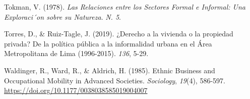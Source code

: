 \documentclass[
  letterpaper,
  12pt,
  oneside,
  spanish,
  doublespacing,
  headsepline,
  parskip]{MastersDoctoralThesis}
\newlength{\cslhangindent}
\newlength{\cslentryspacingunit} %
\newenvironment{CSLReferences}[2] %
 {%
  \setlength{\parindent}{0pt}
  \ifodd #1
  \let\oldpar\par
  \def\par{\hangindent=\cslhangindent\oldpar}
  \fi
  \setlength{\parskip}{#2\cslentryspacingunit}
 }%
 {}
\begin{document}
\begin{CSLReferences}{1}{0}
\leavevmode{}%
Tokman, V. (1978). \emph{Las Relaciones entre los Sectores Formal e
Informal: Una Exploraci´on sobre su Natureza}. \emph{N. 5}.

\leavevmode{}%
Torres, D., \& Ruiz-Tagle, J. (2019). ¿Derecho a la vivienda o la
propiedad privada? De la política pública a la informalidad urbana en el
Área Metropolitana de Lima (1996-2015). \emph{136}, 5-29.

\leavevmode{}%
Waldinger, R., Ward, R., \& Aldrich, H. (1985). Ethnic Business and
Occupational Mobility in Advanced Societies. \emph{Sociology},
\emph{19}(4), 586-597. \url{https://doi.org/10.1177/0038038585019004007}

\end{CSLReferences}
\end{document}
